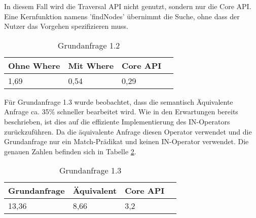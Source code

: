In diesem Fall wird die Traversal API nicht genutzt, sondern nur die Core API. Eine Kernfunktion namens 'findNodes' übernimmt die Suche, ohne dass der Nutzer das Vorgehen spezifizieren muss.  
\FloatBarrier
\begin{table}[h]
	\centering
		\begin{tabular}{ |p{3cm}|p{3cm}|p{3cm}|p{3cm}|  }
			\hline
			Ohne Where& Mit Where  &Core API\\
			\hline
			1,69   &  0,54  &0,29 \\
			\hline
		\end{tabular}
		\FloatBarrier
		\caption{Grundanfrage 1.2}
		\label{tab:Query1_2}
\end{table}
\FloatBarrier
Für Grundanfrage 1.3 wurde beobachtet, dass die semantisch Äquivalente Anfrage ca. 35\% schneller bearbeitet wird. Wie in den Erwartungen bereits beschrieben, ist dies auf die effiziente Implementierung des IN-Operators zurückzuführen. Da die äquivalente Anfrage diesen Operator verwendet und die Grundanfrage nur ein Match-Prädikat und keinen IN-Operator verwendet.
Die genauen Zahlen befinden sich in Tabelle	\ref{tab:Query1_3}.
\begin{table}[h]
	\centering
		\begin{tabular}{ |p{3cm}|p{3cm}|p{3cm}|p{3cm}|  }
			\hline
			Grundanfrage & Äquivalent&Core API\\
			\hline
			 13,36    & 8,66 &  3,2\\
			\hline
		\end{tabular}
		\caption{Grundanfrage 1.3}
		\label{tab:Query1_3}
\end{table}
\FloatBarrier

